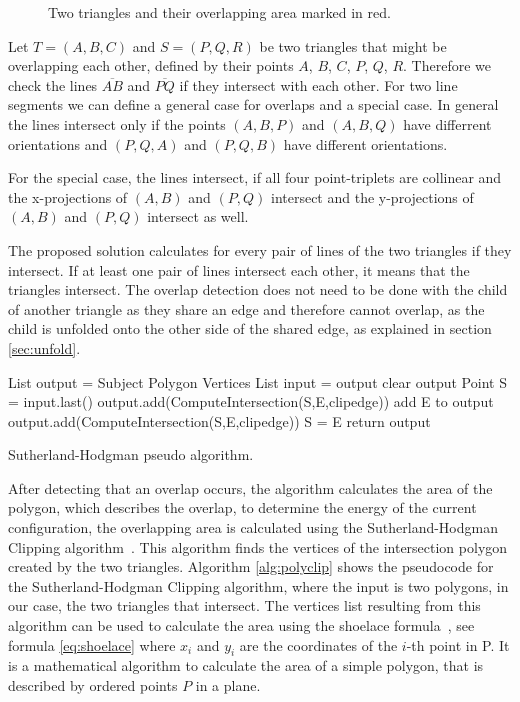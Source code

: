 \documentclass[draft,final]{vutinfth} %
\begin{document}
\begin{figure}

\caption{Two triangles and their overlapping area marked in red.}
\label{fig:overlap}
\end{figure}

Let $T = (A,B,C)$ and $S = (P,Q,R)$ be two triangles that might be overlapping each other, defined by their points $A$, $B$, $C$, $P$, $Q$, $R$. Therefore we check the lines $\overline{AB}$ and $\overline{PQ}$ if they intersect with each other. For two line segments we can define a general case for overlaps and a special case. In general the lines intersect only if the points $(A,B,P)$ and $(A,B,Q)$ have differrent orientations and $(P,Q,A)$ and $(P,Q,B)$ have different orientations.

For the special case, the lines intersect, if all four point-triplets are collinear and the x-projections of $(A,B)$ and $(P,Q)$ intersect and the y-projections of $(A,B)$ and $(P,Q)$ intersect as well.

The proposed solution calculates for every pair of lines of the two triangles if they intersect. If at least one pair of lines intersect each other, it means that the triangles intersect. The overlap detection does not need to be done with the child of another triangle as they share an edge and therefore cannot overlap, as the child is unfolded onto the other side of the shared edge, as explained in section \ref{sec:unfold}.

\begin{algorithm}
List output = Subject Polygon Vertices\;
{
List input = output\;
clear output\;
Point S = input.last()\;
{
{
{
output.add(ComputeIntersection(S,E,clipedge))\;
}
add E to output\;
}
{
{
output.add(ComputeIntersection(S,E,clipedge))\;
}
S = E\;
}
}
}
return output\;
\caption{Sutherland-Hodgman pseudo algorithm.}
\label{alg:polyclip}
\end{algorithm}

After detecting that an overlap occurs, the algorithm calculates the area of the polygon, which describes the overlap, to determine the energy of the current configuration, the overlapping area is calculated using the Sutherland-Hodgman Clipping algorithm~\cite{sutherland1974reentrant}. This algorithm finds the vertices of the intersection polygon created by the two triangles. Algorithm \ref{alg:polyclip} shows the pseudocode for the Sutherland-Hodgman Clipping algorithm, where the input is two polygons, in our case, the two triangles that intersect. The vertices list resulting from this algorithm can be used to calculate the area using the shoelace formula~\cite{vslapak2017automated}, see formula \ref{eq:shoelace} where $x_i$ and $y_i$ are the coordinates of the $i$-th point in P. It is a mathematical algorithm to calculate the area of a simple polygon, that is described by ordered points $P$ in a plane.
\end{document}
